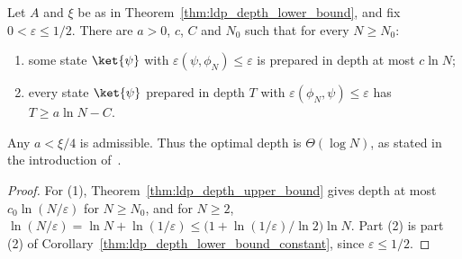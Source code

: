 \begin{corollary}
    \label{cor:ldp_depth_theta_log}
    \leanok
    Let $A$ and $\xi$ be as in Theorem~\ref{thm:ldp_depth_lower_bound}, and
    fix $0<\varepsilon\le1/2$. There are $a>0$, $c$, $C$ and $N_0$ such that
    for every $N\ge N_0$:
    \begin{enumerate}
        \item some state $\ket{\psi}$ with
              $\varepsilon(\psi,\phi_N)\le\varepsilon$ is prepared in depth
              at most $c\ln N$;
        \item every state $\ket{\psi}$ prepared in depth $T$ with
              $\varepsilon(\phi_N,\psi)\le\varepsilon$ has $T\ge a\ln N-C$.
    \end{enumerate}
    Any $a<\xi/4$ is admissible. Thus the optimal depth is $\Theta(\log N)$,
    as stated in the introduction of~\cite{Malz2024Preparation}.
\end{corollary}
\begin{proof}
    \leanok
    For (1), Theorem~\ref{thm:ldp_depth_upper_bound} gives depth at most
    $c_0\ln(N/\varepsilon)$ for $N\ge N_0$, and for $N\ge2$,
    $\ln(N/\varepsilon)=\ln N+\ln(1/\varepsilon)
        \le\bigl(1+\ln(1/\varepsilon)/\ln2\bigr)\ln N$. Part (2) is part
    (2) of Corollary~\ref{thm:ldp_depth_lower_bound_constant}, since
    $\varepsilon\le1/2$.
\end{proof}




